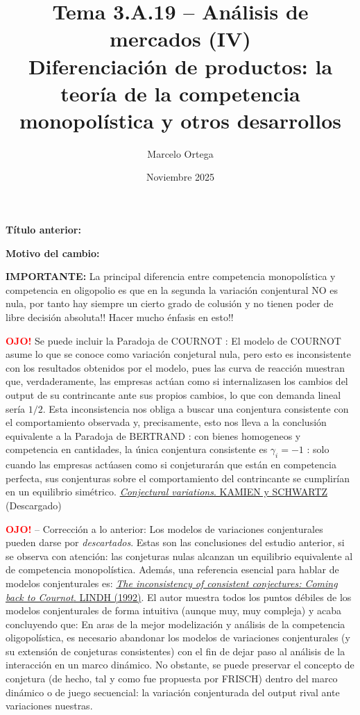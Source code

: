 \documentclass[10pt,a4paper]{article}
\title{Tema 3.A.19 -- Análisis de mercados (IV)\\
\large Diferenciación de productos: la teoría de la competencia monopolística y otros desarrollos}
\author{Marcelo Ortega}
\date{Noviembre 2025}
\newcommand{\puntosclave}[1]{%
  \begin{tcolorbox}[
    colframe=black,
    title={Puntos clave},
    before upper={\setlength{\parindent}{0.5cm}\setlength{\parskip}{0.5\baselineskip}}
  ]
  #1
  \end{tcolorbox}
}
\newcommand{\modificaciones}[1]{
  \begin{tcolorbox}[
    colback=white,
    colframe=red,
    title={Modificaciones a realizar},
    before upper={\setlength{\parindent}{0.5cm}\setlength{\parskip}{0.5\baselineskip}}
  ]
  #1
  \end{tcolorbox}
}
\newcommand{\changebox}{%
\begin{tcolorbox}[title={Historial de cambios del tema}]
\textbf{Título anterior:} \OldTitle\par
\textbf{Motivo del cambio:} \ChangeWhy
\end{tcolorbox}
}
\begin{document}
\maketitle
\changebox

\newpage

\puntosclave{ %
    }
\vspace{1cm}

\modificaciones{
    \textbf{IMPORTANTE:} La principal diferencia entre competencia monopolística y competencia en oligopolio es que en la segunda la variación conjentural NO es nula, por tanto hay siempre un cierto grado de colusión y no tienen poder de libre decisión absoluta!! Hacer mucho énfasis en esto!!

    \textcolor{red}{\textbf{OJO!}} Se puede incluir la Paradoja de COURNOT : El modelo de COURNOT asume lo que se conoce como variación conjetural nula, pero esto es inconsistente con los resultados obtenidos por el modelo, pues las curva de reacción muestran que, verdaderamente, las empresas actúan como si internalizasen los cambios del output de su contrincante ante sus propios cambios, lo que con demanda lineal sería $1/2$. Esta inconsistencia nos obliga a buscar una conjentura consistente con el comportamiento observada y, precisamente, esto nos lleva a la conclusión equivalente a la Paradoja de BERTRAND : con bienes homogeneos y competencia en cantidades, la única conjentura consistente es $\gamma_i=-1$ : solo cuando las empresas actúasen como si conjeturarán que están en competencia perfecta, sus conjenturas sobre el comportamiento del contrincante se cumplirían en un equilibrio simétrico. \href{https://www.kellogg.northwestern.edu/research/math/papers/466.pdf?utm_source=chatgpt.com}{\textit{Conjectural variations}. KAMIEN y SCHWARTZ} (Descargado)

    \textcolor{red}{\textbf{OJO!}} -- Corrección a lo anterior: Los modelos de variaciones conjenturales pueden darse por \textit{descartados}. Estas son las conclusiones del estudio anterior, si se observa con atención: las conjeturas nulas alcanzan un equilibrio equivalente al de competencia monopolística. Además, una referencia esencial para hablar de modelos conjenturales es: \href{https://www.sciencedirect.com/science/article/pii/016726819290053E}{\textit{The inconsistency of consistent conjectures: Coming back to Cournot}. LINDH (1992)}. El autor muestra todos los puntos débiles de los modelos conjenturales de forma intuitiva (aunque muy, muy compleja) y acaba concluyendo que: En aras de la mejor modelización y análisis de la competencia oligopolística, es necesario abandonar los modelos de variaciones conjenturales (y su extensión de conjeturas consistentes) con el fin de dejar paso al análisis de la interacción en un marco dinámico. No obstante, se puede preservar el concepto de conjetura (de hecho, tal y como fue propuesta por FRISCH) dentro del marco dinámico o de juego secuencial: la variación conjenturada del output rival ante variaciones nuestras. 
    }
\end{document}
